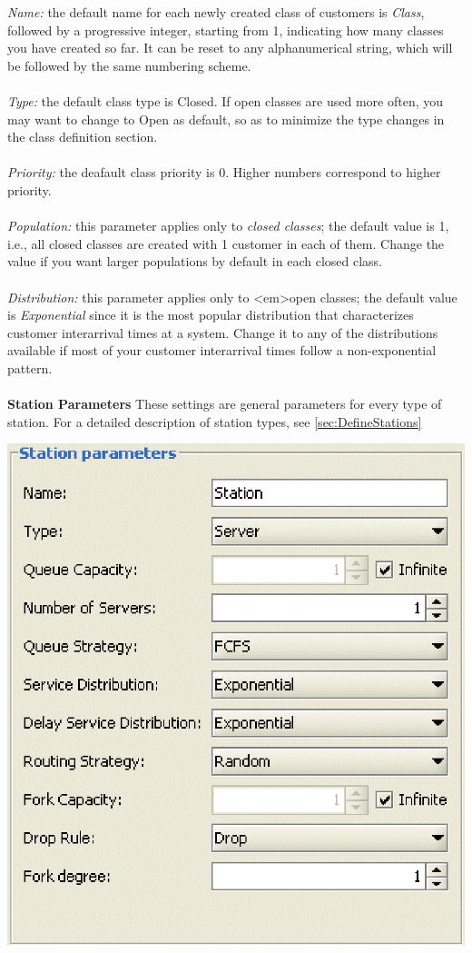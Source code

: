 \begin{description*}
\begin{center}
\end{center}
\emph{Name:} the default name for each newly created class of customers is \emph{Class}, followed by a progressive integer, starting from 1, indicating how many classes you have created so far. It can be reset to any alphanumerical string, which will be followed by the same numbering scheme.\\\\
\emph{Type:}
the default class type is Closed. If open classes are used more often, you may want to change to Open as default, so as to minimize the type changes in the class definition section.\\\\
\emph{Priority:}
the deafault class priority is 0. Higher numbers correspond to higher priority.\\\\
\emph{Population:}
this parameter applies only to \emph{closed classes}; the default value is 1, i.e., all closed classes are created with 1 customer in each of them. Change the value if you want larger populations by default in each closed class.\\\\
\emph{Distribution:}
this parameter applies only to <em>open classes; the default value is \emph{Exponential} since it is the most popular distribution that characterizes customer interarrival times at a system. Change it to any of the distributions available if most of your customer interarrival times follow a non-exponential pattern.\\\\
\textbf{Station Parameters}
These settings are general parameters for every type of station. For a detailed description of station types, see \autoref{sec:DefineStations}
\begin{center}
\includegraphics[scale=.5]{img/jsim/Station_parameters.eps}

\end{center}
\end{description*}
